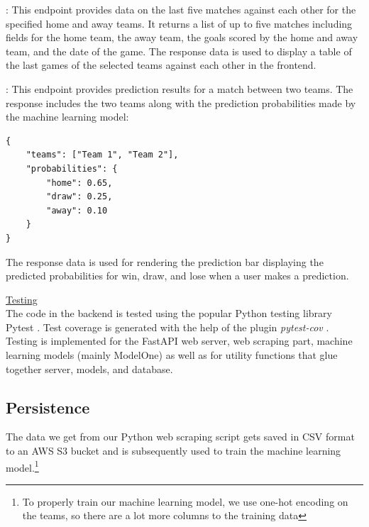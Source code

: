 \documentclass[conference,a4paper,flushend]{cs-techrep}
\begin{document}
: This endpoint provides data on the last five matches against each other for the specified home and away teams. It returns a list of up to five matches including fields for the home team, the away team, the goals scored by the home and away team, and the date of the game. The response data is used to display a table of the last games of the selected teams against each other in the frontend.


: This endpoint provides prediction results for a match between two teams. The response includes the two teams along with the prediction probabilities made by the machine learning model: 
\begin{verbatim}
{
    "teams": ["Team 1", "Team 2"],
    "probabilities": {
        "home": 0.65,
        "draw": 0.25,
        "away": 0.10
    }
}
\end{verbatim}
The response data is used for rendering the prediction bar displaying the predicted probabilities for win, draw, and lose when a user makes a prediction.

\vspace{0.15cm}
\underline{Testing}\vspace{0.1cm}\\
The code in the backend is tested using the popular Python testing library Pytest \cite{pytest}. Test coverage is generated with the help of the plugin \emph{pytest-cov} \cite{pytest-cov}. Testing is implemented for the FastAPI web server, web scraping part, machine learning models (mainly ModelOne) as well as for utility functions that glue together server, models, and database.


\subsection{Persistence} \label{section_persistence}
The data we get from our Python web scraping script gets saved in CSV format to an AWS S3 bucket \cite{noauthor_amazon_nodate} and is subsequently used to train the machine learning model.\footnote{To properly train our machine learning model, we use one-hot encoding on the teams, so there are a lot more columns to the training data}
\end{document}
